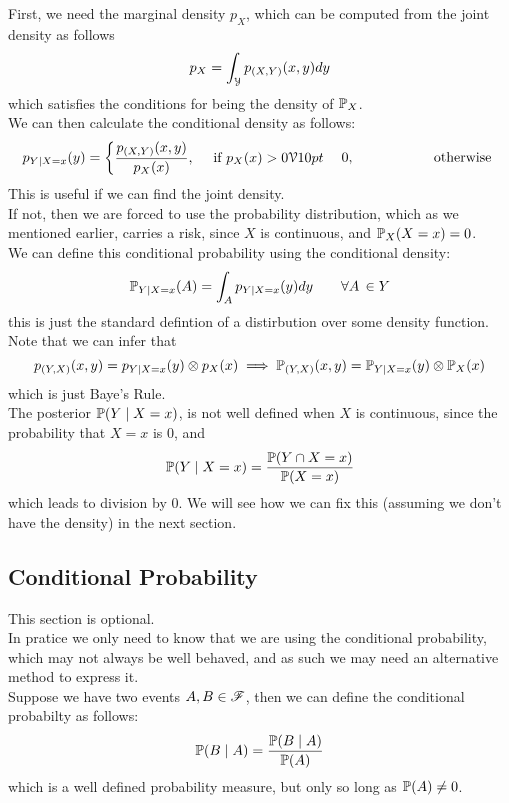 \documentclass[12pt]{article}
\begin{document}
First, we need the marginal density $p_X$,
which can be computed from the joint
density as follows
\[ p_X = \int_{\mathcal{Y}} p_{(X, Y)}(x, y)dy \]
which satisfies the conditions
for being the density of $\mathbb{P}_X$. \\

We can then calculate the conditional
density as follows:
\[ p_{Y \mid X = x}(y)
= \begin{cases} 
    \dfrac{p_{(X, Y)}(x, y)}{p_X(x)},
    \quad \text { if } p_X(x) > 0
    \mathcal{V}{10pt}
     \end{cases}{
        0, \qquad \qquad
        \quad \,\, \text{ otherwise }
    }
\]
This is useful if we can find the
joint density. \\
If not, then we are forced 
to use the probability distribution,
which as we mentioned earlier,
carries a risk,
since $X$ is continuous,
and $\mathbb{P}_X(X = x) = 0$. \\

We can define this conditional
probability using the conditional
density:
\[ \mathbb{P}_{Y \mid X = x}(A)
= \int_{A} p_{Y \mid X = x}(y)dy
\qquad \forall A \, \in Y \]
this is just the standard defintion
of a distirbution over some density function. \\

Note that we can infer that
\[ p_{(Y, X)}(x, y) = p_{Y \mid X = x}(y)
\otimes p_{X}(x)  
\implies \mathbb{P}_{(Y, X)}(x, y)
= \mathbb{P}_{Y \mid X = x}(y) \otimes \mathbb{P}_{X}(x) \]
which is just Baye's Rule. \\

The posterior $\mathbb{P}(Y \mid X = x)$,
is not well defined when $X$ is continuous,
since the probability that $X = x$
is $0$,
and 
\[ \mathbb{P}(Y \mid X = x) = 
\dfrac{\mathbb{P}(Y \cap X = x)}
{\mathbb{P}(X = x)}  \]
which leads to division by $0$.
We will see how we can fix this
(assuming we don't have the density)
in the next section. \\

\newpage

\subsection*{Conditional Probability}

This section is optional. \\
In pratice we only need to know
that we are using the conditional
probability, which may not always be
well behaved, 
and as such we may need an alternative
method to express it. \\

Suppose we have two events 
$A, B \in \mathscr{F}$,
then we can define the conditional
probabilty as follows:
\[ \mathbb{P}(B \mid A)
= \dfrac{\mathbb{P}(B \mid A)}{\mathbb{P}(A)} \]
which is a well defined probability measure,
but only so long as $\mathbb{P}(A) \neq 0$. \\
\end{document}
